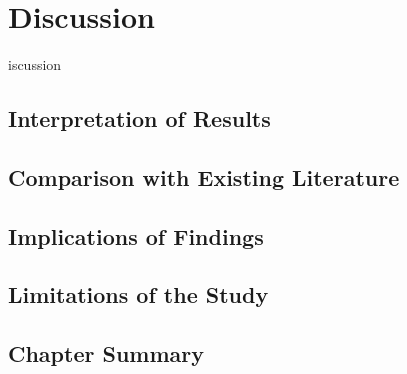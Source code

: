 \chapter{Discussion}\label{ch06}

iscussion


\section{Interpretation of Results}

\section{Comparison with Existing Literature}

\section{Implications of Findings}

\section{Limitations of the Study}


\section{Chapter Summary}
